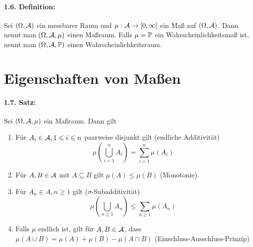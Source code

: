 \paragraph{1.6. Definition:} Sei $(\Omega,\mathcal{A})$ ein messbarer Raum und $\mu:\mathcal{A}\to[0,\infty]$ ein Ma\ss{} auf $(\Omega,\mathcal{A})$. Dann nennt man $(\Omega,\mathcal{A},\mu)$ einen Ma\ss{}raum. Falls $\mu=\mathbb{P}$ ein Wahrscheinlichkeitsma\ss{} ist, nennt man $(\Omega, \mathcal{A}, \mathbb{P})$ einen Wahrscheinlichkeitsraum.

\section*{Eigenschaften von Ma\ss{}en}

\paragraph{1.7. Satz:} Sei $(\Omega,\mathcal{A},\mu)$ ein Ma\ss{}raum. Dann gilt
\begin{enumerate}[label=(\roman*)]
    \item F\"ur $A_i\in\mathcal{A},1\leqslant i\leqslant n$ paarweise disjunkt gilt (endliche Additivit\"at)
    $$\mu\left(\bigcup_{i=1}^nA_i\right)=\sum_{i=1}^n\mu(A_i)$$
    \item F\"ur $A,B\in\mathcal{A}$ mit $A\subseteq B$ gilt $\mu(A)\leq\mu(B)$ (Monotonie). 
    \item F\"ur $A_n\in A,n\geq1$ gilt ($\sigma$-Subadditivit\"at)
    $$\mu\left(\bigcup_{n\geq1}A_n\right)\leq\sum_{n\geq1}\mu(A_n)$$
    \item Falls $\mu$ endlich ist, gilt f\"ur $A,B\in\mathcal{A}$, dass $\mu(A\cup B)=\mu(A)+\mu(B)-\mu(A\cap B)$ (Einschluss-Ausschluss-Prinzip)
\end{enumerate}

